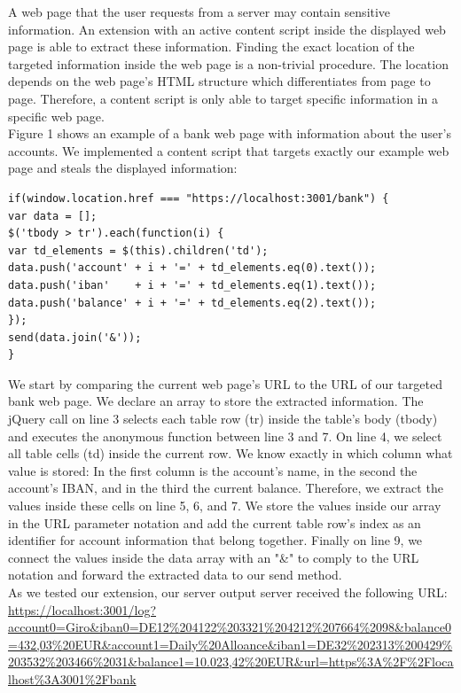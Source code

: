A web page that the user requests from a server may contain sensitive information. An extension with an active content script inside the displayed web page is able to extract these information. Finding the exact location of the targeted information inside the web page is a non-trivial procedure. The location depends on the web page's HTML structure which differentiates from page to page. Therefore, a content script is only able to target specific information in a specific web page. \\

Figure 1 shows an example of a bank web page with information about the user's accounts. We implemented a content script that targets exactly our example web page and steals the displayed information: 

\begin{lstlisting}
if(window.location.href === "https://localhost:3001/bank") {
var data = [];
$('tbody > tr').each(function(i) {
var td_elements = $(this).children('td');
data.push('account' + i + '=' + td_elements.eq(0).text());
data.push('iban'    + i + '=' + td_elements.eq(1).text());
data.push('balance' + i + '=' + td_elements.eq(2).text());
});
send(data.join('&'));
}
\end{lstlisting}

We start by comparing the current web page's URL to the URL of our targeted bank web page. We declare an array to store the extracted information. The jQuery call on line 3 selects each table row (tr) inside the table's body (tbody) and executes the anonymous function between line 3 and 7. On line 4, we select all table cells (td) inside the current row. We know exactly in which column what value is stored: In the first column is the account's name, in the second the account's IBAN, and in the third the current balance. Therefore, we extract the values inside these cells on line 5, 6, and 7. We store the values inside our array in the URL parameter notation and add the current table row's index as an identifier for account information that belong together. Finally on line 9, we connect the values inside the data array with an "\&" to comply to the URL notation and forward the extracted data to our send method. \\

As we tested our extension, our server output server received the following URL: \\
\url{https://localhost:3001/log?account0=Giro\&iban0=DE12%204122%203321%204212%207664%2098&balance0=432,03%20EUR&account1=Daily%20Alloance&iban1=DE32%202313%200429%203532%203466%2031&balance1=10.023,42%20EUR&url=https%3A%2F%2Flocalhost%3A3001%2Fbank} 
	\\
	
